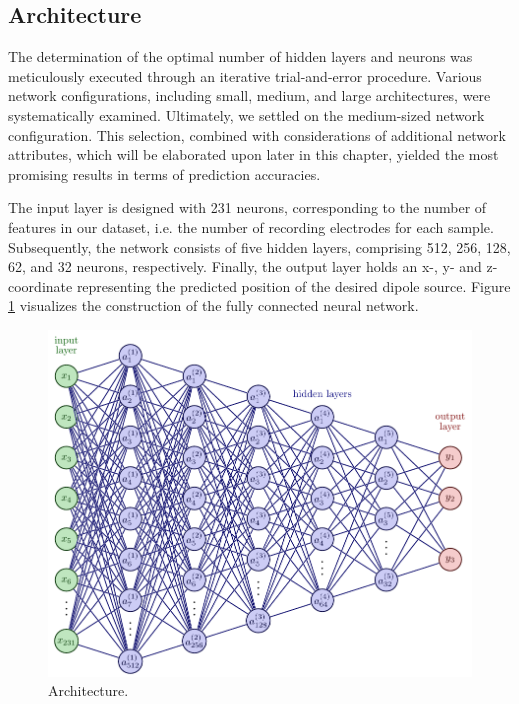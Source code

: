 \documentclass[a4paper, UKenglish, 11pt]{uiomaster}
\begin{document}
\subsection{Architecture}



The determination of the optimal number of hidden layers and neurons was meticulously executed through an iterative trial-and-error procedure. Various network configurations, including small, medium, and large architectures, were systematically examined. Ultimately, we settled on the medium-sized network configuration. This selection, combined with considerations of additional network attributes, which will be elaborated upon later in this chapter, yielded the most promising results in terms of prediction accuracies.

The input layer is designed with 231 neurons, corresponding to the number of features in our dataset, i.e. the number of recording electrodes for each sample. Subsequently, the network consists of five hidden layers, comprising 512, 256, 128, 62, and 32 neurons, respectively. Finally, the output layer holds an x-, y- and z-coordinate representing the predicted position of the desired dipole source. Figure \ref{fig:FFNN_architecture} visualizes the construction of the fully connected neural network.

\begin{figure}[!htb]
    \centering
    \includegraphics[width=\linewidth]{figures/FFNN_architecture.pdf}
    \caption{Architecture.}
    \label{fig:FFNN_architecture}
\end{figure}
\end{document}
